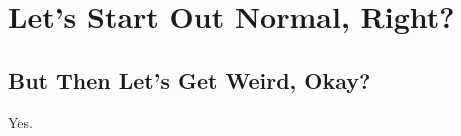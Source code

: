 \section{Let's Start Out Normal,
Right?}\label{lets-start-out-normal-right}

\subsection{But Then Let's Get Weird,
Okay?}\label{but-then-lets-get-weird-okay}

Yes.
